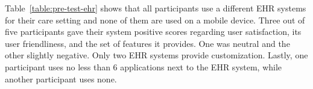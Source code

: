         \begin{table}[!t]
            \caption{Pre-test results: general participant information}\label{table:pre-test}
        \end{table}

        Table~\ref{table:pre-test-ehr} shows that all participants use a different EHR systems for their care setting and none of them are used on a mobile device. Three out of five participants gave their system positive scores regarding user satisfaction, its user friendliness, and the set of features it provides. One was neutral and the other slightly negative. Only two EHR systems provide customization. Lastly, one participant uses no less than 6 applications next to the EHR system, while another participant uses none.

